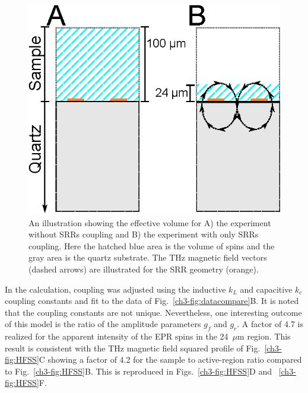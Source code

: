\begin{figure}[htbp]\centering
  \includegraphics{Kapitel/Ch3-Images/Ch4-SampleVisualization.eps}%
  \caption[Illustration of the excited sample volumes.]{An illustration showing the effective volume for A) the experiment without SRRs coupling and B) the experiment with only SRRs coupling. Here the hatched blue area is the volume of spins and the gray area is the quartz substrate. The THz magnetic field vectors (dashed arrows) are illustrated for the SRR geometry (orange).
  \label{ch3-fig:effetachi}}
\end{figure}

In the calculation, coupling was adjusted using the inductive $k_L$ and capacitive $k_c$ coupling constants and fit to the data of Fig.~\ref{ch3-fig:datacompare}B. It is noted that the coupling constants are not unique. Nevertheless, one interesting outcome of this model is the ratio of the amplitude parameters $g_f$ and $g_r$. A factor of 4.7 is realized for the apparent intensity of the EPR spins in the 24~$\mu$m region. This result is consistent with the THz magnetic field squared profile of Fig.~\ref{ch3-fig:HFSS}C showing a factor of 4.2 for the sample to active-region ratio compared to Fig.~\ref{ch3-fig:HFSS}B. This is reproduced in Figs.~\ref{ch3-fig:HFSS}D and ~\ref{ch3-fig:HFSS}F.

